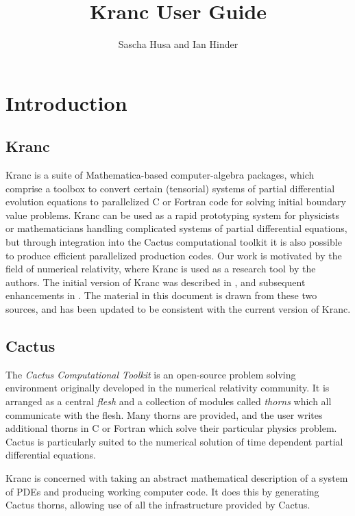 \documentclass{report}
\title{Kranc User Guide}
\author{Sascha Husa and Ian Hinder}
\begin{document}
\maketitle
\tableofcontents
\chapter{Introduction}

\section{Kranc}
Kranc is a suite of Mathematica-based computer-algebra packages, which
comprise a toolbox to convert certain (tensorial) systems of partial
differential evolution equations to parallelized C or Fortran code for
solving initial boundary value problems.  Kranc can be used as a rapid
prototyping system for physicists or mathematicians handling
complicated systems of partial differential equations, but through
integration into the Cactus computational toolkit it is also possible
to produce efficient parallelized production codes.  Our work is
motivated by the field of numerical relativity, where Kranc is used as
a research tool by the authors.  The initial version of Kranc was
described in \cite{KrancPaper}, and subsequent enhancements in
\cite{IHPhDThesis}.  The material in this document is drawn from these
two sources, and has been updated to be consistent with the current
version of Kranc.

\section{Cactus}

The {\em Cactus Computational Toolkit} is an open-source problem
solving environment originally developed in the numerical relativity
community.  It is arranged as a central {\em flesh} and a collection
of modules called {\em thorns} which all communicate with the
flesh. Many thorns are provided, and the user writes additional thorns
in C or Fortran which solve their particular physics problem.  Cactus
is particularly suited to the numerical solution of time dependent
partial differential equations.

Kranc is concerned with taking an abstract mathematical description of
a system of PDEs and producing working computer code.  It does this by
generating Cactus thorns, allowing use of all the infrastructure
provided by Cactus.
\end{document}
